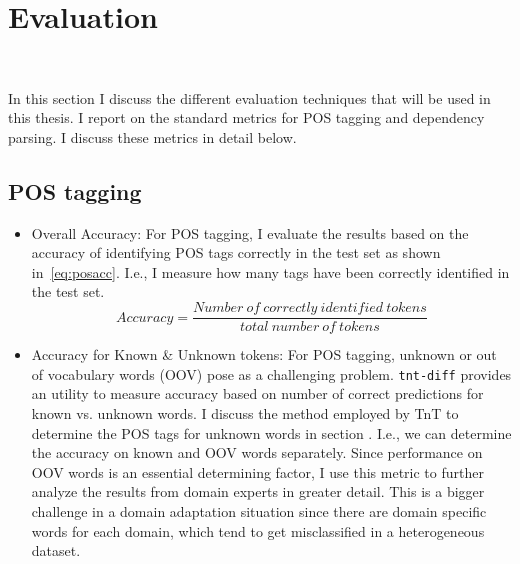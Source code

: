 
\section{Evaluation}

~

In this section I discuss the different evaluation techniques that will be used in this thesis. I report on the standard metrics for POS tagging and dependency parsing. I discuss these metrics in detail below.


\subsection{POS tagging}
    \begin{itemize}
        \item Overall Accuracy: For POS tagging, I evaluate the results based on the accuracy of identifying POS tags correctly in the test set as shown in~\ref{eq:posacc}. I.e., I measure how many tags have been correctly identified in the test set.
        \begin{equation} \label{eq:posacc}
            Accuracy = \frac{Number\ of\ correctly\ identified\ tokens}{total\ number\ of\ tokens}
        \end{equation}
        \item Accuracy for Known \& Unknown tokens: For POS tagging, unknown or out of vocabulary words (OOV) pose as a challenging problem. \texttt{tnt-diff} provides an utility to measure accuracy based on number of correct predictions for known vs. unknown words. I discuss the method employed by TnT to determine the POS tags for unknown words in section . I.e., we can determine the accuracy on known and OOV words separately. Since performance on OOV words is an essential determining factor, I use this metric to further analyze the results from domain experts in greater detail. This is a bigger challenge in a domain adaptation situation since there are domain specific words for each domain, which tend to get misclassified in a heterogeneous dataset.
    \end{itemize}
